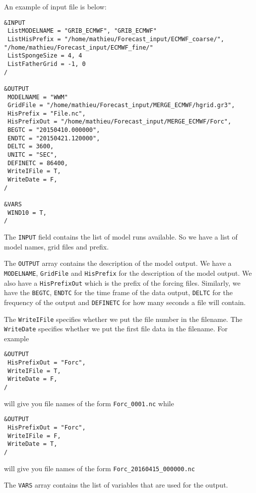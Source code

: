\documentclass[12pt]{amsart}
\begin{document}
An example of input file is below:
\begin{verbatim}
&INPUT
 ListMODELNAME = "GRIB_ECMWF", "GRIB_ECMWF"
 ListHisPrefix = "/home/mathieu/Forecast_input/ECMWF_coarse/", "/home/mathieu/Forecast_input/ECMWF_fine/"
 ListSpongeSize = 4, 4
 ListFatherGrid = -1, 0
/

&OUTPUT
 MODELNAME = "WWM"
 GridFile = "/home/mathieu/Forecast_input/MERGE_ECMWF/hgrid.gr3",
 HisPrefix = "File.nc",
 HisPrefixOut = "/home/mathieu/Forecast_input/MERGE_ECMWF/Forc",
 BEGTC = "20150410.000000",
 ENDTC = "20150421.120000",
 DELTC = 3600, 
 UNITC = "SEC", 
 DEFINETC = 86400,
 WriteIFile = T,
 WriteDate = F,
/

&VARS
 WIND10 = T, 
/
\end{verbatim}
The {\tt INPUT} field contains the list of model runs available. So we have a list of model names, grid files and prefix.

The {\tt OUTPUT} array contains the description of the model output. We have a {\tt MODELNAME}, {\tt GridFile} and {\tt HisPrefix} for the description of the model output. We also have a {\tt HisPrefixOut} which is the prefix of the forcing files.
Similarly, we have the {\tt BEGTC}, {\tt ENDTC} for the time frame of the data output, {\tt DELTC} for the frequency of the output and {\tt DEFINETC} for how many seconds a file will contain.

The {\tt WriteIFile} specifies whether we put the file number in the filename. The {\tt WriteDate} specifies whether we put the first file data in the filename.
For example
\begin{verbatim}
&OUTPUT
 HisPrefixOut = "Forc",
 WriteIFile = T,
 WriteDate = F,
/
\end{verbatim}
will give you file names of the form {\tt Forc\_0001.nc} while
\begin{verbatim}
&OUTPUT
 HisPrefixOut = "Forc",
 WriteIFile = F,
 WriteDate = T,
/
\end{verbatim}
will give you file names of the form {\tt Forc\_20160415\_000000.nc}




The {\tt VARS} array contains the list of variables that are used for the output.
\end{document}
